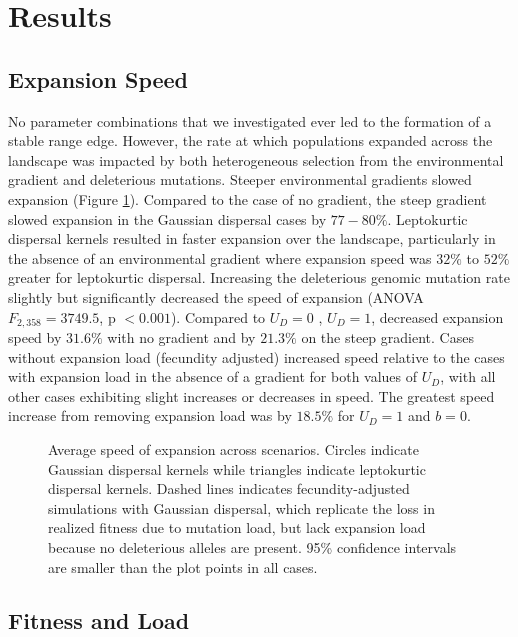 \section{Results}

\subsection{Expansion Speed}
No parameter combinations that we investigated ever led to the formation of a stable range edge. However, the rate at which populations expanded across the landscape was impacted by both heterogeneous selection from the environmental gradient and deleterious mutations. Steeper environmental gradients slowed expansion (Figure \ref{fig:speed}). Compared to the case of no gradient, the steep gradient slowed expansion in the Gaussian dispersal cases by $77-80\%$. Leptokurtic dispersal kernels resulted in faster expansion over the landscape, particularly in the absence of an environmental gradient where expansion speed was $32\%$ to $52\%$ greater for leptokurtic dispersal. Increasing the deleterious genomic mutation rate slightly but significantly decreased the speed of expansion (ANOVA $F_{2,358} = 3749.5$,  p $< 0.001$). Compared to $U_D = 0$ , $U_D = 1$, decreased expansion speed by $31.6\%$ with no gradient and by $21.3\%$ on the steep gradient. Cases without expansion load (fecundity adjusted) increased speed relative to the cases with expansion load in the absence of a gradient for both values of $U_D$, with all other cases exhibiting slight increases or decreases in speed. The greatest speed increase from removing expansion load was by $18.5\%$ for $U_D = 1$ and $b = 0$.  

\begin{figure}[h]
\centering
{}
\caption[~- Average speed of expansion.]{Average speed of expansion across scenarios. Circles indicate Gaussian dispersal kernels while triangles indicate leptokurtic dispersal kernels. Dashed lines indicates fecundity-adjusted simulations with Gaussian dispersal, which replicate the loss in realized fitness due to mutation load, but lack expansion load because no deleterious alleles are present. 95\% confidence intervals are smaller than the plot points in all cases.}
\label{fig:speed}
\end{figure}




\subsection{Fitness and Load}

